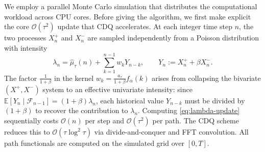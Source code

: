 \documentclass[letterpaper]{article}
\numberwithin{equation}{section}
\theoremstyle{definition}
\theoremstyle{remark}
\begin{document}
We employ a parallel Monte Carlo simulation that distributes the computational
workload across CPU cores. Before giving the algorithm, we first make explicit
the core $\mathcal{O}(\tau^2)$ update that CDQ accelerates. At each integer time
step $n$, the two processes $X_n^+$ and $X_n^-$ are sampled independently from
a Poisson distribution with intensity
\begin{equation}\label{eq:lambda-update}
  \lambda_n = \hat{\mu}_\tau(n) + \sum_{k=1}^{n-1} w_k Y_{n-k},
  \qquad
  Y_n := X_n^+ + \beta X_n^-.
\end{equation}
The factor $\frac{1}{1+\beta}$ in the kernel
$w_k = \frac{a_\tau}{1+\beta} f_\alpha(k)$ arises from collapsing the bivariate
$(X^+,X^-)$ system to an effective univariate intensity: since
$\mathbb{E}[Y_n \mid \mathcal{F}_{n-1}] = (1+\beta)\lambda_n$, each historical
value $Y_{n-k}$ must be divided by $(1+\beta)$ to recover the contribution to
$\lambda_n$. Computing \eqref{eq:lambda-update} sequentially costs
$\mathcal{O}(n)$ per step and $\mathcal{O}(\tau^2)$ per path. The CDQ scheme
reduces this to $\mathcal{O}(\tau\log^2\tau)$ via divide-and-conquer and FFT
convolution. All path functionals are computed on the simulated grid over
$[0,T]$.
\end{document}
